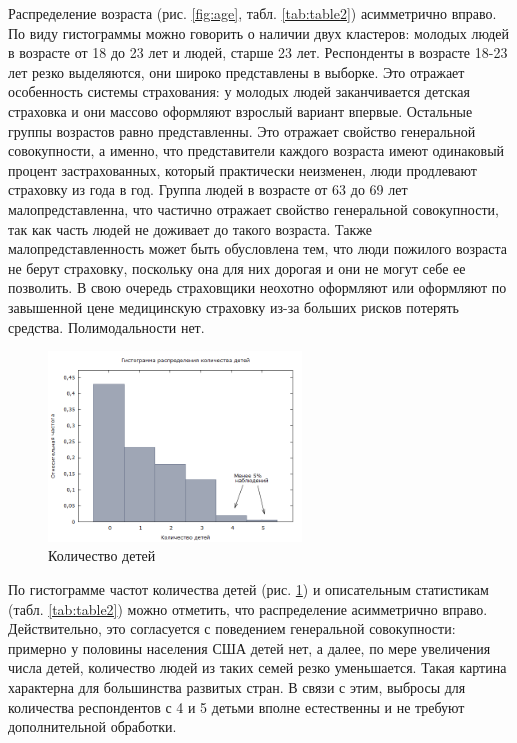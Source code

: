 \documentclass[a4paper,12pt]{article}
\begin{document}
Распределение возраста (рис. \ref{fig:age}, табл. \ref{tab:table2}) асимметрично вправо. По виду гистограммы можно говорить о наличии двух кластеров: молодых людей в возрасте от 18 до 23 лет и людей, старше 23 лет. Респонденты в возрасте 18-23 лет резко выделяются, они широко представлены в выборке. Это отражает особенность системы страхования: у молодых людей заканчивается детская страховка и они массово оформляют взрослый вариант впервые. Остальные группы возрастов равно представленны. Это отражает свойство генеральной совокупности, а именно, что представители каждого возраста имеют одинаковый процент застрахованных, который практически неизменен, люди продлевают страховку из года в год. Группа людей в возрасте от 63 до 69 лет малопредставленна, что частично отражает свойство генеральной совокупности, так как часть людей не доживает до такого возраста. Также малопредставленность может быть обусловлена тем, что люди пожилого возраста не берут страховку, поскольку она для них дорогая и они не могут себе ее позволить. В свою очередь страховщики неохотно оформляют или оформляют по завышенной цене медицинскую страховку из-за больших рисков потерять средства. Полимодальности нет.

\begin{figure}[H]
	\includegraphics[width=0.6\textwidth]{../[graphics]/children.png}
	\centering
	\caption{Количество детей}
	\label{fig:children}
\end{figure}

По гистограмме частот количества детей (рис. \ref{fig:children}) и описательным статистикам (табл. \ref{tab:table2}) можно отметить, что распределение асимметрично вправо. Действительно, это согласуется с поведением генеральной совокупности: примерно у половины населения США детей нет, а далее, по мере увеличения числа детей, количество людей из таких семей резко уменьшается. Такая картина характерна для большинства развитых стран. В связи с этим, выбросы для количества респондентов с 4 и 5 детьми вполне естественны и не требуют дополнительной обработки.
\end{document}
